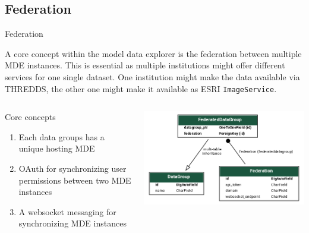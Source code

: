 
\subsection*{Federation} \label{sec:federation}

\begin{frame}{Federation} \label{frm:federation}

    A core concept within the model data explorer is the federation between
    multiple MDE instances. This is essential as multiple institutions might
    offer different services for one single dataset. One institution might make
    the data available via THREDDS, the other one might make it available as
    ESRI \lstinline|ImageService|.

    \begin{columns}
        \begin{column}{0.45\textwidth}
            \begin{block}{Core concepts}
                \begin{enumerate}
                    \item Each data groups has a unique hosting MDE
                    \item OAuth for synchronizing user permissions between two MDE instances
                    \item A websocket messaging for synchronizing MDE instances
                \end{enumerate}
            \end{block}
        \end{column}
        \begin{column}{0.45\textwidth}
            \includegraphics[width=\textwidth]{figures/mde-federation-models.png}
        \end{column}
    \end{columns}

\end{frame}

